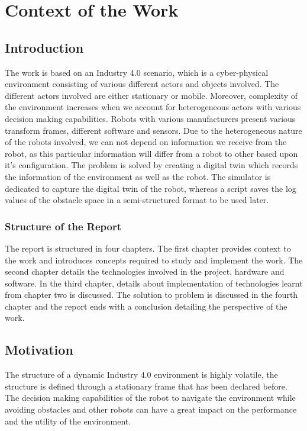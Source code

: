 \chapter{Context of the Work}

\label{Chapter1}

\section{Introduction}
The work is based on an Industry 4.0 scenario, which is a cyber-physical environment consisting of various different 
actors and objects involved. The different actors involved are either stationary or mobile. Moreover, complexity of the 
environment increases when we account for heterogeneous actors with various decision making capabilities. Robots with various
manufacturers present various transform frames, different software and sensors. Due to the heterogeneous nature of the robots 
involved, we can not depend on information we receive from the robot, as this particular information will differ from a robot 
to other based upon it's configuration. The problem is solved by creating a digital twin which records the information of the 
environment as well as the robot. The simulator is dedicated to capture the digital twin of the robot, whereas a script
saves the log values of the obstacle space in a semi-structured format to be used later.

\subsection{Structure of the Report}
The report is structured in four chapters. The first chapter provides context to the work and introduces concepts required to study and 
implement the work. The second chapter details the technologies involved in the project, hardware and software. In the third chapter, 
details about implementation of technologies learnt from chapter two is discussed. The solution to problem is discussed in the fourth chapter 
and the report ends with a conclusion detailing the perspective of the work. 

\section{Motivation}
The structure of a dynamic Industry 4.0 environment is highly volatile, the structure is defined through a stationary frame that 
has been declared before. The decision making capabilities of the robot to navigate the environment while avoiding obstacles and 
other robots can have a great impact on the performance and the utility of the environment. 

